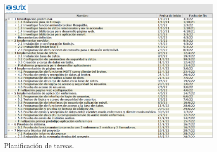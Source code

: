\documentclass[
11pt, %
]{charter}
\begin{document}
\begin{landscape}
\begin{figure}

\centering 
\includegraphics[height=.85\textheight]{./Figuras/tareas.png}
\caption{Planificación de tareas.}
\label{fig:diagGantt0}

\end{figure}
\end{landscape}




\end{document}
